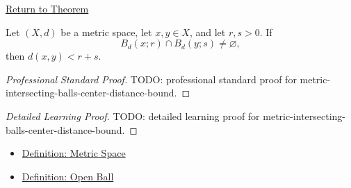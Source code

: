 \newpage
{}
\label{prf:metric-intersecting-balls-center-distance-bound}

\begin{remark*}[Return]
\hyperref[thm:metric-intersecting-balls-center-distance-bound]{Return to Theorem}
\end{remark*}

\begin{theorem*}
Let \((X,d)\) be a metric space, let \(x,y\in X\), and let \(r,s>0\).  If
\[
  B_d(x;r)\cap B_d(y;s)\neq\varnothing,
\]
then \(d(x,y)<r+s\).
\end{theorem*}

\begin{proof}[Professional Standard Proof]
\LRAProofBodyStart
TODO: professional standard proof for metric-intersecting-balls-center-distance-bound.
\end{proof}

\begin{proof}[Detailed Learning Proof]
\LRAProofBodyStart
TODO: detailed learning proof for metric-intersecting-balls-center-distance-bound.
\end{proof}

\begin{remark*}
\end{remark*}

\begin{dependencies}
\begin{itemize}
  \item \hyperref[def:metric-space]{Definition: Metric Space}
  \item \hyperref[def:metric-open-ball]{Definition: Open Ball}
\end{itemize}
\end{dependencies}

\clearpage
